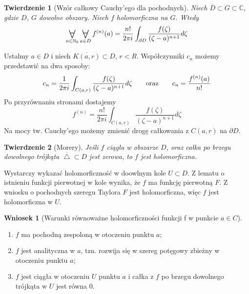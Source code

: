 \documentclass[11pt]{article}
\newcommand{\closure}[1]{\overline{#1}} %
\newcommand{\Forall}[1]{\mathop{\vcenter{\hbox{\LARGE$\forall$}}}\limits_{#1}} %
\theoremstyle{plain}
\newtheorem*{theorem}{Twierdzenie}
\theoremstyle{definition}
\newtheorem*{corollary}{Wniosek}
\theoremstyle{remark}
\let\oldendproof\endproof
\renewenvironment{proof}[1][\proofname]{
  \oldproof[\textsc{\small #1}]
}{\oldendproof}
\begin{document}
\begin{theorem}[Wzór całkowy Cauchy'ego dla pochodnych]
  Niech $ \closure{D} \subset G \subset \mathbb{C} $, gdzie $ D $, $ G $ dowolne obszary.
  Niech $ f $ holomorficzna na $ G $.
  Wtedy
  $$ \Forall{n \in \mathbb{N}_0} \Forall{a \in D} f^{(n)}(a) = \frac{n!}{2 \pi i} \int_{\partial D} \frac{f(\zeta)}{(\zeta - a)^{n+1}} d\zeta $$
\end{theorem}

\begin{proof}
  Ustalmy $ a \in D $ i niech $ \closure{K(a, r)} \subset D $, $ r < R $.
  Współczynniki $ c_n $ możemy przedstawić na dwa sposoby:
  $$
    c_n = \frac{1}{2 \pi i} \int_{C(a, r)} \frac{f(\zeta)}{(\zeta-a)^{n+1}} d\zeta
    \qquad \textnormal{oraz} \qquad
    c_n = \frac{f^{(n)}(a)}{n!}
  $$
  Po przyrównaniu stronami dostajemy
  $$
    f^{(n)} = \frac{n!}{2 \pi i} \int_{C(a, r)} \frac{f(\zeta)}{(\zeta-a)^{n+1}} d\zeta
  $$
  Na mocy tw. Cauchy'ego możemy zmienić drogę całkowania z $ C(a, r) $ na $ \partial D $.
\end{proof}

\begin{theorem}[Morery]
  Jeśli $ f $ ciągła w obszarze $ D $, oraz
  całka po brzegu dowolnego trójkąta $ \closure{\bigtriangleup} \subset D $ jest zerowa,
  to $ f $ jest holomorficzna.
\end{theorem}

\begin{proof}
  Wystarczy wykazać holomorficzność w doowlnym kole $ U \subset D $.
  Z lematu o istnieniu funkcji pierwotnej w kole wynika, że $ f $ ma funkcję pierwotną $ F $.
  Z wniosku o pochodnych szeregu Taylora $ F $ jest holomorficzna, więc $ f $ jest holomorficzna w $ U $.
\end{proof}

\begin{corollary}[Warunki równoważne holomorficzności funkcji f w punkcie $ a \in C $]
  $ $
  \begin{enumerate}
    \item $ f $ ma pochodną zespoloną w otoczeniu punktu $ a $; \label{war-holo-pochodna}
    \item $ f $ jest analityczna w $ a $, tzn. rozwija się w szereg potęgowy zbieżny w otoczeniu punktu $ a $; \label{war-holo-anal}
    \item $ f $ jest ciągła w otoczeniu $ U $ punktu $ a $ i całka z $ f $ po brzegu dowolnego trójkąta w $ U $ jest równa $ 0 $. \label{war-holo-troj}
  \end{enumerate}
\end{corollary}
\end{document}
